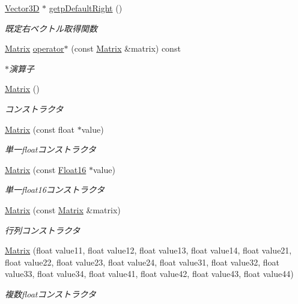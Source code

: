 \begin{DoxyCompactItemize}
\mbox{\hyperlink{class_vector3_d}{Vector3D}} $\ast$ \mbox{\hyperlink{class_matrix_a0096877aa292e1e8801deb912e1c8245}{getp\+Default\+Right}} ()
\begin{DoxyCompactList}\small\item\em 既定右ベクトル取得関数 \end{DoxyCompactList}\item 
\mbox{\hyperlink{class_matrix}{Matrix}} \mbox{\hyperlink{class_matrix_aa2f78f6d34450195fec250fee6172afd}{operator$\ast$}} (const \mbox{\hyperlink{class_matrix}{Matrix}} \&matrix) const
\begin{DoxyCompactList}\small\item\em $\ast$演算子 \end{DoxyCompactList}\item 
\mbox{\hyperlink{class_matrix_a2dba13c45127354c9f75ef576f49269b}{Matrix}} ()
\begin{DoxyCompactList}\small\item\em コンストラクタ \end{DoxyCompactList}\item 
\mbox{\hyperlink{class_matrix_aec226891d64369eb1a1051ad96bf03da}{Matrix}} (const float $\ast$value)
\begin{DoxyCompactList}\small\item\em 単一floatコンストラクタ \end{DoxyCompactList}\item 
\mbox{\hyperlink{class_matrix_acf565e5e85611da8b1559604021fa71e}{Matrix}} (const \mbox{\hyperlink{_vector3_d_8h_afe61185afc2bf3856c12613d99eede01}{Float16}} $\ast$value)
\begin{DoxyCompactList}\small\item\em 単一float16コンストラクタ \end{DoxyCompactList}\item 
\mbox{\hyperlink{class_matrix_a2b1fedfb1b076d4ae504d2c61019871f}{Matrix}} (const \mbox{\hyperlink{class_matrix}{Matrix}} \&matrix)
\begin{DoxyCompactList}\small\item\em 行列コンストラクタ \end{DoxyCompactList}\item 
\mbox{\hyperlink{class_matrix_a3f698b5ae393f6f8395c323e4701686c}{Matrix}} (float value11, float value12, float value13, float value14, float value21, float value22, float value23, float value24, float value31, float value32, float value33, float value34, float value41, float value42, float value43, float value44)
\begin{DoxyCompactList}\small\item\em 複数floatコンストラクタ \end{DoxyCompactList}\item 

\end{DoxyCompactItemize}

